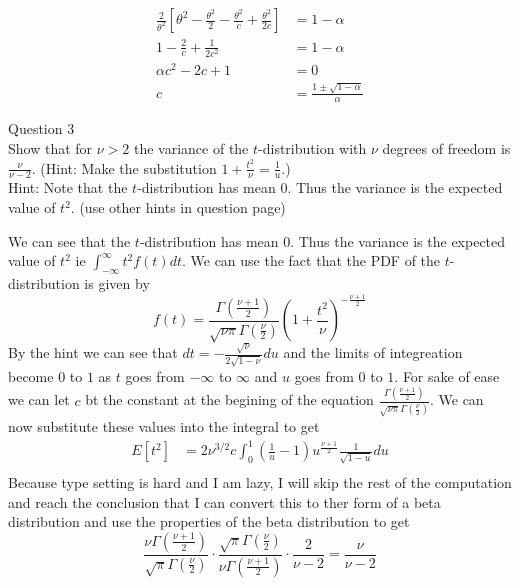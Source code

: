 \documentclass[answers,12pt,addpoints]{exam}
\begin{document}
\begin{questions}
\begin{solution}
\begin{align*}
            \frac{2}{\theta^2} \left[ \theta^2 - \frac{\theta^2}{2} - \frac{\theta^2}{c} + \frac{\theta^2}{2c} \right] &= 1- \alpha\\
            1 - \frac{2}{c} + \frac{1}{2c^2} &= 1 - \alpha\\
            \alpha c^2 - 2c + 1 &= 0\\
            c &= \frac{1 \pm \sqrt{1 - \alpha}}{\alpha}
        \end{align*}
    \end{solution}
    \question Question 3\\
    Show that for \( \nu > 2 \) the variance of the \( t \)-distribution
    with \( \nu \) degrees of freedom is \( \frac{\nu}{\nu - 2} \). (Hint: Make the substitution \( 1 + \frac{t^2}{\nu} = \frac{1}{u} \).)\\
    Hint: Note that the \( t \)-distribution has mean 0. Thus the variance is the expected value of \( t^2 \). (use other hints in question page)
    \begin{solution}
        We can see that the \( t \)-distribution has mean 0. Thus the variance is the expected value of \( t^2 \) ie $\int_{-\infty}^{\infty}t^2 f(t)dt$. We can use the fact that the PDF of the \( t \)-distribution is given by 
        \[f(t) = \frac{\Gamma \left(  \frac{\nu +1}{2} \right)}{\sqrt{\nu \pi} \Gamma\left( \frac{\nu}{2} \right)} \left(1 + \frac{t^2}{\nu}\right)^{-\frac{\nu +1}{2}}\]
        By the hint we can see that $dt = -\frac{\sqrt{\nu}}{2\sqrt{1-\nu}}du $ and the limits of integreation become $0$ to $1$ as $t$ goes from $-\infty$ to $\infty$ and $u$ goes from $0$ to $1$. For sake of ease we can let $c$ bt the constant at the begining of the equation $\frac{\Gamma \left(  \frac{\nu +1}{2} \right)}{\sqrt{\nu \pi} \Gamma\left( \frac{\nu}{2} \right)}$. We can now substitute these values into the integral to get
        \begin{align*}
            E[t^2] &= 2 \nu^{3/2} c \int_0^1 (\frac{1}{u}-1) u^{\frac{\nu +1}{2}} \frac{1}{\sqrt{1-u}} du\\
        \end{align*}
        Because type setting is hard and I am lazy, I will skip the rest of the computation and reach the conclusion that I can convert this to ther form of a beta distribution and use the properties of the beta distribution to get
        $$ \frac{ \nu \Gamma \left(  \frac{\nu +1}{2} \right)}{\sqrt{\pi} \Gamma\left( \frac{\nu}{2} \right)} \cdot \frac{\sqrt{\pi} \Gamma\left( \frac{\nu}{2} \right)}{\nu \Gamma \left(  \frac{\nu +1}{2} \right) }\cdot \frac{2}{\nu - 2} = \frac{\nu}{\nu - 2}$$

\end{solution}
\end{questions}
\end{document}
